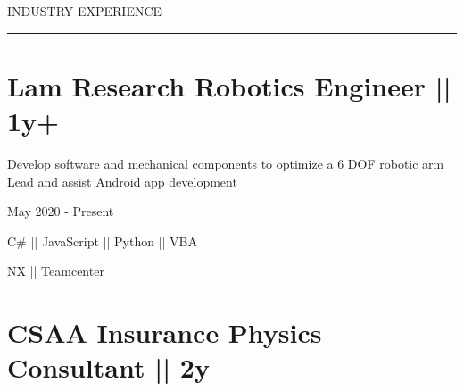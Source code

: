 \documentclass[letterpaper,10pt,oneside]{article}
\begin{document}
\begin{body}





{
\hspace{-1.72in}\noindent\color{cblue}

\vspace{1ex}
{INDUSTRY EXPERIENCE} %
}

\vspace{-6.6ex}
{\hspace{-1.73in}\noindent\color{dblue}\rule{6.935in}{0.4pt}} %
\vspace{-5ex}


\section
{\textbf{Lam Research}
\newline
Robotics Engineer || 1y+
\newline}{}

\vspace{-2.5ex}
\begin{detail}
\BulletItem
Develop software and mechanical components to optimize a 6 DOF robotic arm 
\BulletItem
Lead and assist Android app development
\end{detail}

\begin{subtitle}
\vspace{-7.8ex}
{{May 2020 - Present}} 
\end{subtitle}

{
\vspace{0.5ex}
\color{cyan}\small
{C\# || JavaScript || Python || VBA} %
}

{
\vspace{-2.5ex}\hspace{3.17in}
\color{cyan}\small
{NX || Teamcenter} %
}
\vspace{-3.0ex}

\section
{\textbf{CSAA Insurance}
\newline
Physics Consultant || 2y
\newline}



\end{body}
\end{document}
